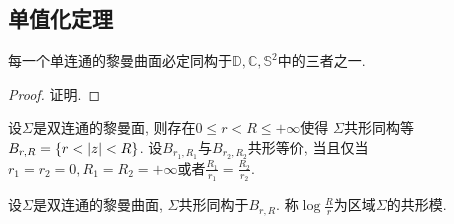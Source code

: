 \subsection{单值化定理}
\begin{theorem}[单值化定理]
    每一个单连通的黎曼曲面必定同构于$\mathbb{D}, \mathbb{C}, \mathbb{S}^2$中的三者之一.
\end{theorem}
\begin{proof}
    证明.
\end{proof}
\begin{theorem} \label{uniformization_annulus}
    设$\Sigma$是双连通的黎曼面, 则存在$0 \le r < R \le +\infty$使得 $\Sigma$共形同构等$B_{r,R}=\{r<{\left | z \right |}<R\}$. 设$B_{r_1,R_1}$与$B_{r_2,R_2}$共形等价, 当且仅当$r_1=r_2=0, R_1=R_2=+\infty$或者$\frac{R_1}{r_1}=\frac{R_2}{r_2}$.
\end{theorem}
\begin{definition}\label{conformal_modulus}
    设$\Sigma$是双连通的黎曼曲面, $\Sigma$共形同构于$B_{r,R}$. 称$\log \frac{R}{r}$为区域$\Sigma$的共形模.
\end{definition}
